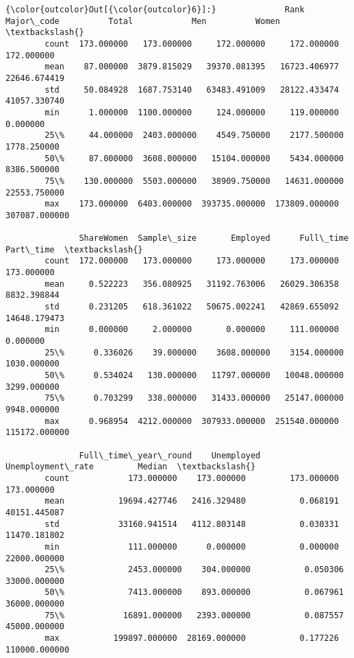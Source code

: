 \documentclass[11pt]{article}
\begin{document}
\begin{Verbatim}[commandchars=\\\{\}]
{\color{outcolor}Out[{\color{outcolor}6}]:}              Rank   Major\_code          Total            Men          Women  \textbackslash{}
        count  173.000000   173.000000     172.000000     172.000000     172.000000   
        mean    87.000000  3879.815029   39370.081395   16723.406977   22646.674419   
        std     50.084928  1687.753140   63483.491009   28122.433474   41057.330740   
        min      1.000000  1100.000000     124.000000     119.000000       0.000000   
        25\%     44.000000  2403.000000    4549.750000    2177.500000    1778.250000   
        50\%     87.000000  3608.000000   15104.000000    5434.000000    8386.500000   
        75\%    130.000000  5503.000000   38909.750000   14631.000000   22553.750000   
        max    173.000000  6403.000000  393735.000000  173809.000000  307087.000000   
        
               ShareWomen  Sample\_size       Employed      Full\_time      Part\_time  \textbackslash{}
        count  172.000000   173.000000     173.000000     173.000000     173.000000   
        mean     0.522223   356.080925   31192.763006   26029.306358    8832.398844   
        std      0.231205   618.361022   50675.002241   42869.655092   14648.179473   
        min      0.000000     2.000000       0.000000     111.000000       0.000000   
        25\%      0.336026    39.000000    3608.000000    3154.000000    1030.000000   
        50\%      0.534024   130.000000   11797.000000   10048.000000    3299.000000   
        75\%      0.703299   338.000000   31433.000000   25147.000000    9948.000000   
        max      0.968954  4212.000000  307933.000000  251540.000000  115172.000000   
        
               Full\_time\_year\_round    Unemployed  Unemployment\_rate         Median  \textbackslash{}
        count            173.000000    173.000000         173.000000     173.000000   
        mean           19694.427746   2416.329480           0.068191   40151.445087   
        std            33160.941514   4112.803148           0.030331   11470.181802   
        min              111.000000      0.000000           0.000000   22000.000000   
        25\%             2453.000000    304.000000           0.050306   33000.000000   
        50\%             7413.000000    893.000000           0.067961   36000.000000   
        75\%            16891.000000   2393.000000           0.087557   45000.000000   
        max           199897.000000  28169.000000           0.177226  110000.000000   
        

\end{Verbatim}
\end{document}
